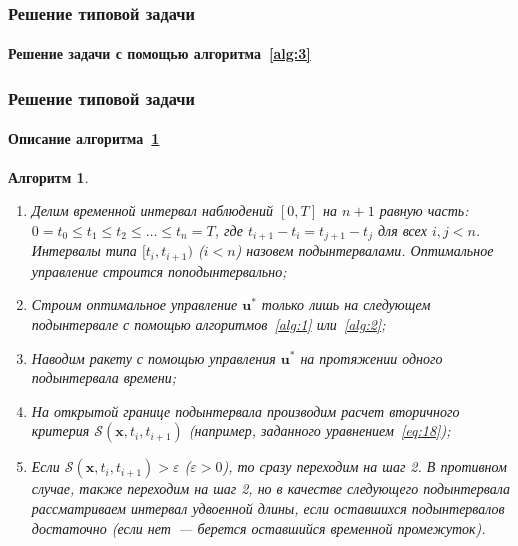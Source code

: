 \documentclass[ignorenonframetext,hyperref={pdftex,unicode},compress]{beamer}
\newtheorem{alg}{Алгоритм}
\begin{document}
\begin{frame}
	\frametitle{Решение типовой задачи}
	\framesubtitle{Решение задачи с помощью алгоритма~\ref{alg:3}}
    
    \begin{figure}\center
        
        \label{fig:alg3}
    \end{figure}
\end{frame}



\begin{frame}
	\frametitle{Решение типовой задачи}
	\framesubtitle{Описание алгоритма~\ref{alg:4}}\footnotesize
    
    \begin{alg}\label{alg:4}~
        \begin{enumerate}
            \item
                Делим временной интервал наблюдений $[0, T]$ на $n+1$ равную часть: $0 = t_0 \leqslant t_1 \leqslant t_2 \leqslant \ldots \leqslant t_{n} = T$, где $t_{i+1}-t_i = t_{j+1}-t_j$ для всех $i, j < n$. Интервалы типа $[t_i, t_{i+1})$ ($i<n$) назовем подынтервалами. Оптимальное управление строится поподынтервально;

            \item
                Строим оптимальное управление $\mathbf{u}^*$ только лишь на следующем подынтервале с помощью алгоритмов~\ref{alg:1} или~\ref{alg:2};

            \item
                Наводим ракету с помощью управления $\mathbf{u}^*$ на протяжении одного подынтервала времени;

            \item
                На открытой границе подынтервала производим расчет вторичного критерия $\mathscr{S}(\mathbf{x}, t_i, t_{i+1})$ (например, заданного уравнением~\ref{eq:18});

            \item
                Если $\mathscr{S}(\mathbf{x}, t_i, t_{i+1}) > \varepsilon$ ($\varepsilon > 0$), то сразу переходим на шаг 2. В противном случае, также переходим на шаг 2, но в качестве следующего подынтервала рассматриваем интервал удвоенной длины, если оставшихся подынтервалов достаточно (если нет~--- берется оставшийся временной промежуток).
        \end{enumerate}
    \end{alg}
\end{frame}
\end{document}
